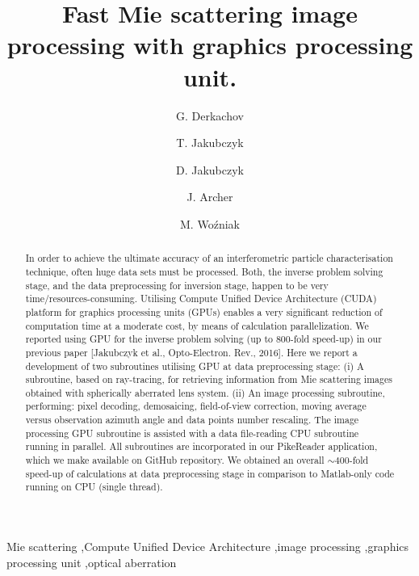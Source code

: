 \documentclass[preprint,review,12pt,dvips]{elsarticle}
\begin{document}
\begin{frontmatter}
\title{Fast Mie scattering image processing with graphics processing unit.}
\author[ifpan]{G. Derkachov}
\author[iccm]{T. Jakubczyk}
\author[ifpan]{D. Jakubczyk}
\author[ifpan]{J. Archer}
\author[ifpan]{M. {Wo\'{z}niak}}

\address[ifpan]{Institute of Physics, Polish Academy of Sciences,
Aleja~{Lotnik\'{o}w} 32/46, PL-02668 Warsaw, Poland}
\address[iccm]{Institute of Control and Computation Engineering, Warsaw University of Technology,
ul.~Nowowiejska 15/19, PL-00665 Warsaw, Poland} 

\begin{abstract}
		In order to achieve the ultimate accuracy of an interferometric particle characterisation technique, often huge data sets
	must be processed. Both, the inverse problem solving stage, and the data preprocessing for inversion stage, happen to be
	very time/resources-consuming. Utilising Compute Unified Device Architecture (CUDA) platform for graphics processing units
	(GPUs) enables a very significant reduction of computation time at a moderate cost, by means of calculation
	parallelization. We reported using GPU for the inverse problem solving (up to 800-fold speed-up) in our previous paper
	[Jakubczyk et al., Opto-Electron. Rev., 2016]. Here we report a development of two subroutines utilising GPU at data
	preprocessing stage: (i) A subroutine, based on ray-tracing, for retrieving information from Mie scattering images
	obtained with spherically aberrated lens system. (ii) An image processing subroutine, performing: pixel decoding,
	demosaicing, field-of-view correction, moving average versus observation azimuth angle and data points number rescaling.
	The image processing GPU subroutine is assisted with a data file-reading CPU subroutine running in parallel. All
	subroutines are incorporated in our PikeReader application, which we make available on GitHub repository. We obtained an
	overall $\sim 400$-fold speed-up of calculations at data preprocessing stage in comparison to Matlab-only code running on
	CPU (single thread).
\end{abstract}

\begin{keyword}
	Mie scattering \sep Compute Unified Device Architecture \sep image processing \sep graphics processing unit \sep optical
	aberration
\end{keyword}
\end{frontmatter}
\end{document}
